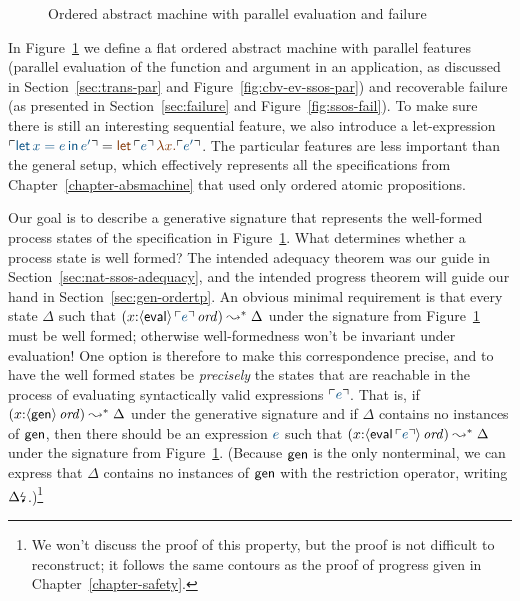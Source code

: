 \begin{figure}[t]
\caption{Ordered abstract machine with parallel evaluation and failure}
\label{fig:gen-order-prog}
\end{figure}

In Figure~\ref{fig:gen-order-prog} we define a flat ordered abstract
machine with parallel features (parallel evaluation of the function
and argument in an application, as discussed in
Section~\ref{sec:trans-par} and Figure~\ref{fig:cbv-ev-ssos-par}) and
recoverable failure (as presented in Section~\ref{sec:failure} and
Figure~\ref{fig:ssos-fail}). To make sure there is still an
interesting sequential feature, we also introduce a let-expression
$\interp{{\sf let}\,x = e\,{\sf in}\,e'} = \lf{{\sf
    let}\,\interp{e}\,\lambda x.\interp{e'}}$. The particular features
are less important than the general setup, which effectively
represents all the specifications from
Chapter~\ref{chapter-absmachine} that used only ordered atomic
propositions.


Our goal is to describe a generative signature that represents the
well-formed process states of the specification in
Figure~\ref{fig:gen-order-prog}. What determines whether a process
state is well formed? The intended adequacy theorem was our guide in
Section~\ref{sec:nat-ssos-adequacy}, and the intended progress theorem
will guide our hand in Section~\ref{sec:gen-ordertp}. An obvious
minimal requirement is that every state $\Delta$ such that
$(x{:}\istrue{\susp{\sf eval}\,\interp{e}}) \leadsto^* \Delta$ under
the signature from Figure~\ref{fig:gen-order-prog} must be well
formed; otherwise well-formedness won't be invariant under evaluation!
One option is therefore to make this correspondence precise, and to
have the well formed states be {\it precisely} the states that are
reachable in the process of evaluating syntactically valid expressions
$\interp{e}$. That is, if $(x{:}{\langle {\sf gen} \rangle}\,{{\it ord}}) \leadsto^*
\Delta$ under the generative signature and if $\Delta$ contains no
instances of ${\sf gen}$, then there should be an expression $\obj{e}$
such that $(x{:}\istrue{\susp{{\sf eval}\,\interp{e}}}) \leadsto^*
\Delta$ under the signature from
Figure~\ref{fig:gen-order-prog}. (Because ${\sf gen}$ is the only
nonterminal, we can express that $\Delta$ contains no instances of
${\sf gen}$ with the restriction operator, writing
${\Delta}{\mbox{\lightning}}_{}$.)\footnote{We won't discuss the proof of this
  property, but the proof is not difficult to reconstruct; it follows
  the same contours as the proof of progress given in
  Chapter~\ref{chapter-safety}.}

